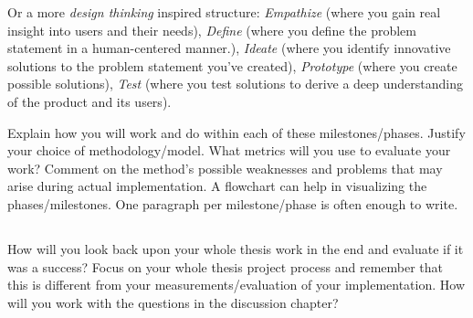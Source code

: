 Or a more \emph{design thinking} inspired structure: \emph{Empathize} (where you gain real insight
into users and their needs), \emph{Define} (where you define the problem statement in a
human-centered manner.), \emph{Ideate} (where you identify innovative solutions to the problem
statement you’ve created), \emph{Prototype} (where you create possible solutions), \emph{Test}
(where you test solutions to derive a deep understanding of the product and its users). 

Explain how you will work and do within each of these milestones/phases. Justify your choice of
methodology/model. What metrics will you use to evaluate your work? Comment on the method's possible
weaknesses and problems that may arise during actual implementation. A flowchart can help in
visualizing the phases/milestones. One paragraph per milestone/phase is often enough to write.


\subsection{}\label{subsec:evalmethod}
How will you look back upon your whole thesis work in the end and evaluate if it was a success?
Focus on your whole thesis project process and remember that this is different from your
measurements/evaluation of your implementation. How will you work with the questions in the
discussion chapter?

